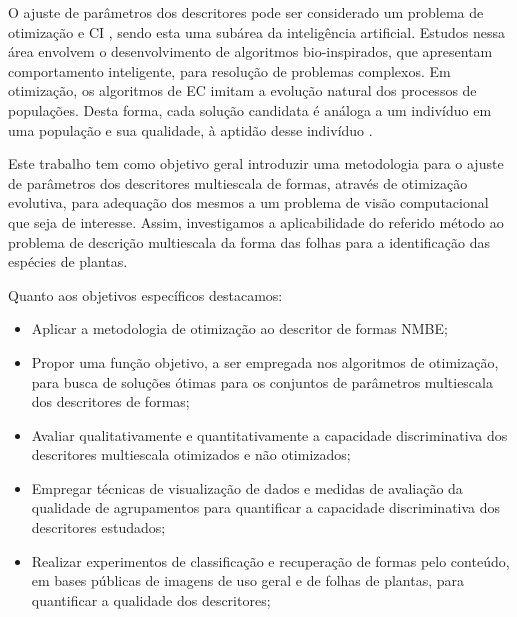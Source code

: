O ajuste de parâmetros dos descritores pode ser considerado um problema de otimização e \ac{CI} \cite{Andries:2007}, sendo esta uma subárea da inteligência artificial. Estudos nessa área envolvem o desenvolvimento de algoritmos bio-inspirados, que apresentam comportamento inteligente, para resolução de problemas complexos. Em otimização, os algoritmos de \ac{EC} imitam a evolução natural dos processos de populações. Desta forma, cada solução candidata é análoga a um indivíduo em uma população e sua qualidade, à aptidão desse indivíduo \cite{Eiben:2015}.

Este trabalho tem como objetivo geral introduzir uma metodologia para o ajuste de parâmetros dos descritores multiescala de formas, através de otimização evolutiva, para adequação dos mesmos a um problema de visão computacional que seja de interesse. Assim, investigamos a aplicabilidade do referido método ao problema de descrição multiescala da forma das folhas para a identificação das espécies de plantas.

Quanto aos objetivos específicos destacamos:

\begin{itemize}
\item Aplicar a metodologia de otimização ao descritor de formas \ac{NMBE};

\item Propor uma função objetivo, a ser empregada nos algoritmos de otimização, para busca de soluções ótimas para os conjuntos de parâmetros multiescala dos descritores de formas;

\item Avaliar qualitativamente e quantitativamente a capacidade discriminativa dos descritores multiescala otimizados e não otimizados;

\item Empregar técnicas de visualização de dados e medidas de avaliação da qualidade de agrupamentos para quantificar a capacidade discriminativa dos descritores estudados; 

\item Realizar experimentos de classificação e recuperação de formas pelo conteúdo, em bases públicas de imagens de uso geral e de folhas de plantas, para quantificar a qualidade dos descritores;

\end{itemize}



